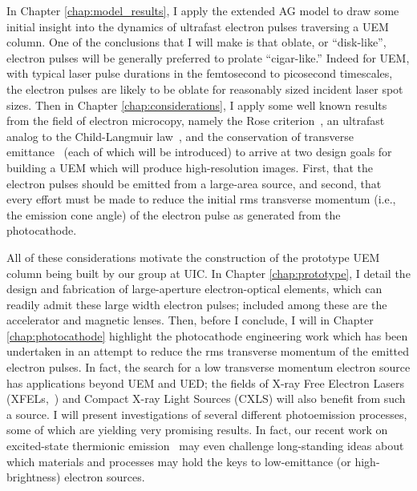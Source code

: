 In Chapter \ref{chap:model_results}, I apply the extended AG model to draw some initial insight into the dynamics of ultrafast electron pulses traversing a UEM column.
One of the conclusions that I will make is that oblate, or ``disk-like'', electron pulses will be generally preferred to prolate ``cigar-like.'' 
Indeed for UEM, with typical laser pulse durations in the femtosecond to picosecond timescales, the electron pulses are likely to be oblate for reasonably sized incident laser spot sizes.
Then in Chapter \ref{chap:considerations}, I apply some well known results from the field of electron microcopy, namely the Rose criterion~\cite{rose_television_1948}, an ultrafast analog to the Child-Langmuir law~\cite{child_discharge_1911,langmuir_effect_1923,valfells_effects_2002}, and the conservation of transverse emittance~\cite{jensen_emittance_2010} (each of which will be introduced) to arrive at two design goals for building a UEM which will produce high-resolution images.
First, that the electron pulses should be emitted from a large-area source, and second, that every effort must be made to reduce the initial rms transverse momentum (i.e., the emission cone angle) of the electron pulse as generated from the photocathode.

All of these considerations motivate the construction of the prototype UEM column being built by our group at UIC.
In Chapter \ref{chap:prototype}, I detail the design and fabrication of large-aperture electron-optical elements, which can readily admit these large width electron pulses; included among these are the accelerator and magnetic lenses.
Then, before I conclude, I will in Chapter \ref{chap:photocathode} highlight the photocathode engineering work which has been undertaken in an attempt to reduce the rms transverse momentum of the emitted electron pulses.
In fact, the search for a low transverse momentum electron source has applications beyond UEM and UED; the fields of X-ray Free Electron Lasers (XFELs,~\cite{nemeth_high_2010}) and Compact X-ray Light Sources (CXLS) \cite{cxls_workshop_report_2012} will also benefit from such a source.
I will present investigations of several different photoemission processes, some of which are yielding very promising results.
In fact, our recent work on excited-state thermionic emission~\cite{berger_excited_2012} may even challenge long-standing ideas about which materials and processes may hold the keys to low-emittance (or high-brightness) electron sources.


